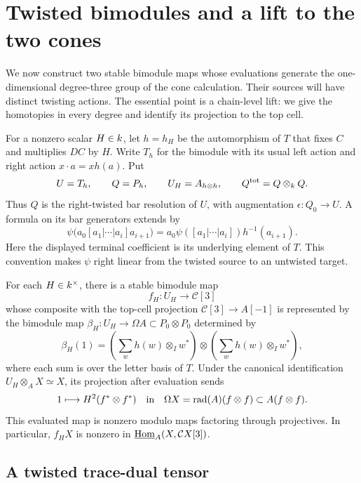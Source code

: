 \section{Twisted bimodules and a lift to the two cones}
\label{sec:lift}

We now construct two stable bimodule maps whose evaluations generate the
one-dimensional degree-three group of the cone calculation.  Their sources
will have distinct twisting actions.  The essential point is a chain-level
lift: we give the homotopies in every degree and identify its projection to
the top cell.

For a nonzero scalar $H\in k$, let $h=h_H$ be the automorphism of $T$
that fixes $C$ and multiplies $DC$ by $H$.  Write $T_h$ for the bimodule
with its usual left action and right action $x\cdot a=xh(a)$.  Put
\[
 U=T_h,\qquad Q=P_h,\qquad
 U_H=A_{h\otimes h},\qquad Q^{\mathrm{tot}}=Q\otimes_k Q.
\]
Thus $Q$ is the right-twisted bar resolution of $U$, with augmentation
$\epsilon:Q_0\to U$.  A formula on its bar generators extends by
\begin{equation}
 \psi\bigl(a_0[a_1|\cdots|a_i]a_{i+1}\bigr)
 =a_0\psi([a_1|\cdots|a_i])h^{-1}(a_{i+1}).
 \label{lift:extension}
\end{equation}
Here the displayed terminal coefficient is its underlying element of $T$.
This convention makes $\psi$ right linear from the twisted source to an
untwisted target.

\begin{proposition}
\label{lift:main}
For each $H\in k^\times$, there is a stable bimodule map
\[
 f_H:U_H\longrightarrow\mathcal C[3]
\]
whose composite with the top-cell projection
$\mathcal C[3]\to A[-1]$ is represented by the bimodule map
$\beta_H:U_H\to\Omega A\subset P_0\otimes P_0$ determined by
\[
 \beta_H(1)=\left(\sum_w h(w)\otimes_I w^*\right)
 \otimes\left(\sum_w h(w)\otimes_I w^*\right),
\]
where each sum is over the letter basis of $T$.
Under the canonical identification $U_H\otimes_A X\simeq X$, its
projection after evaluation sends
\[
 1\longmapsto H^2(f^*\otimes f^*)
 \quad\text{in}\quad
 \Omega X=\operatorname{rad}(A)(f\otimes f)\subset A(f\otimes f).
\]
This evaluated map is nonzero modulo maps factoring through projectives.
In particular, $f_HX$ is nonzero in
$\underline{\operatorname{Hom}}_{A}(X,\mathcal C X[3])$.
\end{proposition}

\subsection{A twisted trace-dual tensor}

